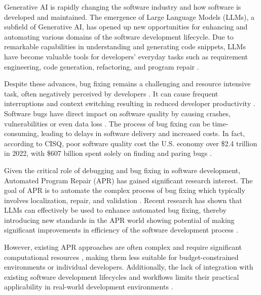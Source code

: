 Generative AI is rapidly changing the software industry and how software is developed and maintained. The emergence of Large Language Models (LLMs), a subfield of Generative AI, has opened up new opportunities for enhancing and automating various domains of the software development lifecycle. Due to remarkable capabilities in understanding and generating code snippets, LLMs have become valuable tools for developers' everyday tasks such as requirement engineering, code generation, refactoring, and program repair \cite{houLargeLanguageModels2024, puvvadiCodingAgentsComprehensive2025}.

Despite these advances, bug fixing remains a challenging and resource intensive task, often negatively perceived by developers  \cite{winterHowDevelopersReally2023}. It can cause frequent interruptions and context switching resulting in reduced developer productivity  \cite{vasilescuSkyNotLimit2016}.
Software bugs have direct impact on software quality by causing crashes, vulnerabilities or even data loss \cite{tihanyiNewEraSoftware2024}.
The process of bug fixing can be time-consuming, leading to delays in software delivery and increased costs. %
In fact, according to CISQ, poor software quality cost the U.S. economy over \$2.4 trillion in 2022, with \$607 billion spent solely on finding and paring bugs \cite{CostPoorSoftware}.

Given the critical role of debugging and bug fixing in software development, Automated Program Repair (APR) has gained significant research interest. The goal of APR is to automate the complex process of bug fixing \cite{houLargeLanguageModels2024} which typically involves localization, repair, and validation \cite{zhangEmpiricalStudyFactors2012, leeUnifiedDebuggingApproach2024,xiaAgentlessDemystifyingLLMbased2024,zhangPATCHEmpoweringLarge2025, wangEmpiricalResearchUtilizing2025}.
Recent research has shown that LLMs can effectively be used to enhance automated bug fixing, thereby introducing new standards in the APR world showing potential of making significant improvements in efficiency of the software development process \cite{xiaAgentlessDemystifyingLLMbased2024,liuMarsCodeAgentAInative2024,yangSWEagentAgentComputerInterfaces2024, sobaniaAnalysisAutomaticBug2023, xiaAutomatedProgramRepair2024, huCanGPTO1Kill2024}.

However, existing APR approaches are often complex and require significant computational resources \cite{rondonEvaluatingAgentbasedProgram2025}, making them less suitable for budget-constrained environments or individual developers. Additionally, the lack of integration with existing software development lifecycles and workflows limits their practical applicability in real-world development environments \cite{chenUnveilingPitfallsUnderstanding2025,liuMarsCodeAgentAInative2024}.


